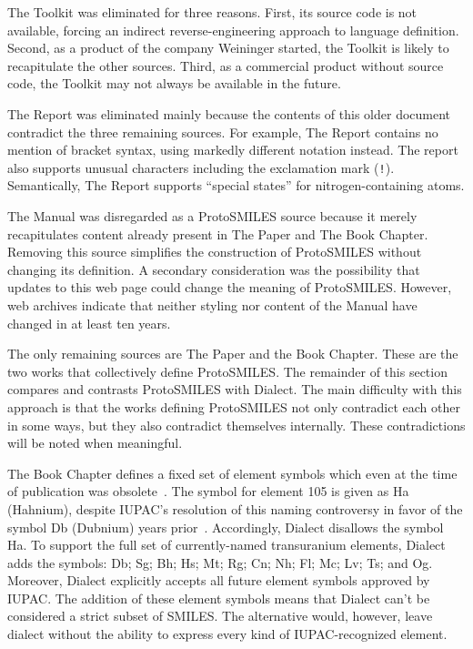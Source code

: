 \documentclass{article}
\def\ttt{\texttt}
\begin{document}
The Toolkit was eliminated for three reasons. First, its source code is not available, forcing an indirect reverse-engineering approach to language definition. Second, as a product of the company Weininger started, the Toolkit is likely to recapitulate the other sources. Third, as a commercial product without source code, the Toolkit may not always be available in the future.

The Report was eliminated mainly because the contents of this older document contradict the three remaining sources. For example, The Report contains no mention of bracket syntax, using markedly different notation instead. The report also supports unusual characters including the exclamation mark (\ttt{!}). Semantically, The Report supports \enquote{special states} for nitrogen-containing atoms.

The Manual was disregarded as a ProtoSMILES source because it merely recapitulates content already present in The Paper and The Book Chapter. Removing this source simplifies the construction of ProtoSMILES without changing its definition. A secondary consideration was the possibility that updates to this web page could change the meaning of ProtoSMILES. However, web archives indicate that neither styling nor content of the Manual have changed in at least ten years.

The only remaining sources are The Paper and the Book Chapter. These are the two works that collectively define ProtoSMILES. The remainder of this section compares and contrasts ProtoSMILES with Dialect. The main difficulty with this approach is that the works defining ProtoSMILES not only contradict each other in some ways, but they also contradict themselves internally. These contradictions will be noted when meaningful.

The Book Chapter defines a fixed set of element symbols which even at the time of publication was obsolete~\cite[p.~83]{weininger:2003}. The symbol for element 105 is given as Ha (Hahnium), despite IUPAC's resolution of this naming controversy in favor of the symbol Db (Dubnium) years prior~\cite{sageson:1997}. Accordingly, Dialect disallows the symbol Ha. To support the full set of currently-named transuranium elements, Dialect adds the symbols: Db; Sg; Bh; Hs; Mt; Rg; Cn; Nh; Fl; Mc; Lv; Ts; and Og. Moreover, Dialect explicitly accepts all future element symbols approved by IUPAC. The addition of these element symbols means that Dialect can't be considered a strict subset of SMILES. The alternative would, however, leave dialect without the ability to express every kind of IUPAC-recognized element.
\end{document}
